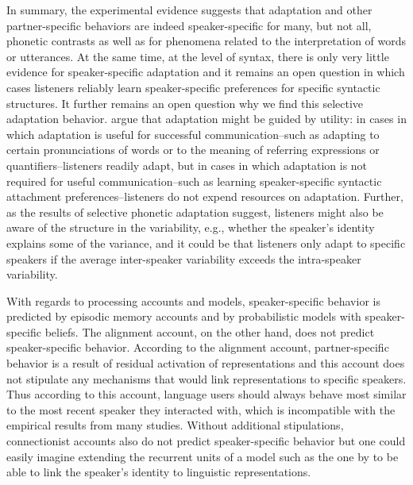 In summary, the experimental evidence suggests that adaptation and other partner-specific behaviors are indeed speaker-specific for many, but not all, phonetic contrasts as
well as for phenomena related to the interpretation of words or utterances. At the same time, at the level of syntax, there is only very little evidence for speaker-specific
adaptation and it remains an open question  in which cases listeners reliably learn speaker-specific preferences for specific syntactic structures. 
It further remains an open question why we find this selective adaptation behavior. \textcite{Ostrand2019}
argue that adaptation might be guided by utility: in cases in which adaptation is useful for successful communication--such as adapting to certain pronunciations of words or to the meaning
of referring expressions or quantifiers--listeners readily adapt, but in cases in which adaptation is not required for useful communication--such as learning speaker-specific syntactic attachment preferences--listeners do not expend resources on adaptation. Further, as the results of selective phonetic adaptation suggest, listeners might also be aware of the structure in the variability, e.g., whether the speaker's
identity explains some of the variance, and it could be that listeners only adapt to specific speakers if the average inter-speaker variability exceeds the intra-speaker variability.

With regards to processing accounts and models, speaker-specific behavior is predicted by episodic memory accounts and by probabilistic models with speaker-specific beliefs. 
The alignment account, on the other hand, does not predict speaker-specific behavior. According to the alignment account, partner-specific behavior is a result of residual activation of representations
and this account does not stipulate any mechanisms that would link representations to specific speakers. Thus according to this account, language users should always behave most similar to 
the most recent speaker they interacted with, which is incompatible with the empirical results from many studies. Without additional stipulations, connectionist accounts also do not 
predict speaker-specific behavior but one could easily imagine extending the recurrent units of a model such as the one by \textcite{Chang2006} to be able to link the speaker's identity to
linguistic representations.

